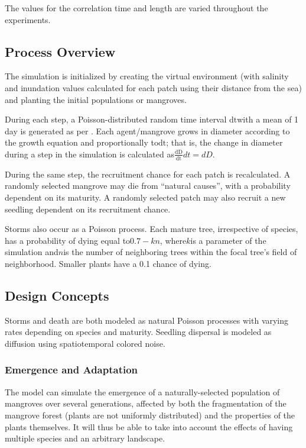 The values for the correlation time and length are varied throughout the
experiments.

\subsection{Process Overview}
The simulation is initialized by creating the virtual environment (with
salinity and inundation values calculated for each patch using their
distance from the sea) and planting the initial populations or
mangroves.

During each step, a Poisson-distributed random time interval
\(\text{dt}\)with a mean of 1 day is generated as per \cite{SalmoJuanico2015}. Each
agent/mangrove grows in diameter according to the growth equation and
proportionally to\(\text{dt}\); that is, the change in diameter during a
step in the simulation is calculated
as\(\frac{\text{dD}}{\text{dt}}dt = dD\).

During the same step, the recruitment chance for each patch is
recalculated. A randomly selected mangrove may die from ``natural
causes'', with a probability dependent on its maturity. A randomly
selected patch may also recruit a new seedling dependent on its
recruitment chance.

Storms also occur as a Poisson process. Each mature tree, irrespective
of species, has a probability of dying equal to\(0.7 - kn\),
where\(k\)is a parameter of the simulation and\(n\)is the number of
neighboring trees within the focal tree's field of neighborhood. Smaller
plants have a 0.1 chance of dying.

\subsection{Design Concepts}

Storms and death are both modeled as natural Poisson processes with
varying rates depending on species and maturity. Seedling dispersal is
modeled as diffusion using spatiotemporal colored noise.

\subsubsection{Emergence and Adaptation}
The model can simulate the emergence of a naturally-selected population
of mangroves over several generations, affected by both the
fragmentation of the mangrove forest (plants are not uniformly
distributed) and the properties of the plants themselves. It will thus
be able to take into account the effects of having multiple species and
an arbitrary landscape.

